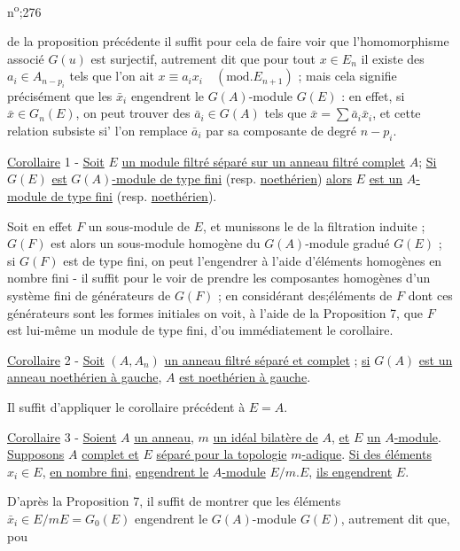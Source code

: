 n\textsuperscript{o};276

de la proposition précédente il suffit pour cela de faire voir que l'homomorphisme associé $G(u)$ est surjectif, autrement dit que pour tout $x\in E_n$ il existe des $a_i\in A_{n-p_i}$ tels que l'on ait $x\equiv a_ix_i\quad(\mathrm{mod.}E_{n+1})$ ; mais cela signifie précisément que les $\bar x_i$ engendrent le $G(A)$-module $G(E)$ : en effet, si $\bar x\in G_n(E)$, on peut trouver des $\bar a_i\in G(A)$ tels que $\bar x=\sum\bar a_i\bar x_i$, et cette relation subsiste si' l'on remplace $\bar a_i$ par sa composante de degré $n-p_i$.

\uline{Corollaire} 1 - \uline{Soit} $E$ \uline{un module filtré séparé sur un anneau filtré complet} $A$; \uline{Si} $G(E)$ \uline{est}  $G(A)$\uline{-module de type fini} (resp. \uline{noethérien}) \uline{alors} $E$ \uline{est un} $A$\uline{-module de type fini} (resp. \uline{noethérien}).

Soit en effet $F$ un sous-module de $E$, et munissons le de la filtration induite ; $G(F)$ est alors un sous-module homogène du $G(A)$-module gradué $G(E)$ ; si $G(F)$ est de type fini, on peut l'engendrer à l'aide d'éléments homogènes en nombre fini - il suffit pour le voir de prendre les composantes homogènes d'un système fini de générateurs de $G(F)$ ; en considérant des;éléments de $F$ dont ces générateurs sont les formes initiales on voit, à l'aide de la Proposition 7, que $F$ est lui-même un module de type fini, d'ou immédiatement le corollaire.

\uline{Corollaire} 2 - \uline{Soit} $(A,A_n)$ \uline{un anneau filtré séparé et complet} ; \uline{si} $G(A)$ \uline{est un anneau noethérien à gauche}, $A$ \uline{est noethérien à gauche}.

Il suffit d'appliquer le corollaire précédent à $E=A$.

\uline{Corollaire} 3 - \uline{Soient} $A$ \uline{un anneau}, $m$ \uline{un idéal bilatère de} $A$, \uline{et} $E$ \uline{un} $A$\uline{-module}. \uline{Supposons} $A$ \uline{complet et} $E$ \uline{séparé pour la topologie} $m$\uline{-adique}. \uline{Si des éléments} $x_i\in E$, \uline{en nombre fini}, \uline{engendrent le} $A$\uline{-module} $E/m.E$, \uline{ils engendrent} $E$.

D'après la Proposition 7, il suffit de montrer que les éléments $\bar x_i\in E/mE=G_0(E)$ engendrent le $G(A)$-module $G(E)$, autrement dit que, pou

